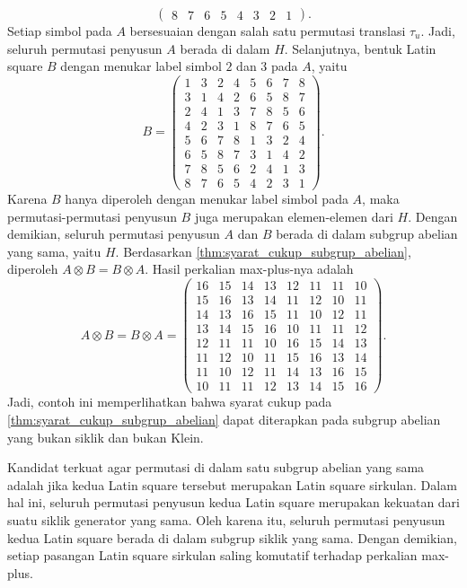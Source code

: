 \begin{contoh}
\[\begin{pmatrix}
      8 & 7 & 6 & 5 & 4 & 3 & 2 & 1
    \end{pmatrix}.
  \]
  Setiap simbol pada $A$ bersesuaian dengan salah satu permutasi translasi
  $\tau_u$. Jadi, seluruh permutasi penyusun $A$ berada di dalam $H$.
  Selanjutnya, bentuk Latin square $B$ dengan menukar label simbol $2$ dan
  $3$ pada $A$, yaitu
  \[
    B=
    \begin{pmatrix}
      1 & 3 & 2 & 4 & 5 & 6 & 7 & 8 \\
      3 & 1 & 4 & 2 & 6 & 5 & 8 & 7 \\
      2 & 4 & 1 & 3 & 7 & 8 & 5 & 6 \\
      4 & 2 & 3 & 1 & 8 & 7 & 6 & 5 \\
      5 & 6 & 7 & 8 & 1 & 3 & 2 & 4 \\
      6 & 5 & 8 & 7 & 3 & 1 & 4 & 2 \\
      7 & 8 & 5 & 6 & 2 & 4 & 1 & 3 \\
      8 & 7 & 6 & 5 & 4 & 2 & 3 & 1
    \end{pmatrix}.
  \]
  Karena $B$ hanya diperoleh dengan menukar label simbol pada $A$, maka
  permutasi-permutasi penyusun $B$ juga merupakan elemen-elemen dari $H$.
  Dengan demikian, seluruh permutasi penyusun $A$ dan $B$ berada di dalam
  subgrup abelian yang sama, yaitu $H$.
  Berdasarkan \autoref{thm:syarat_cukup_subgrup_abelian}, diperoleh
  $A\otimes B=B\otimes A$. Hasil perkalian max-plus-nya adalah
  \[
    A\otimes B
    =
    B\otimes A
    =
    \begin{pmatrix}
      16 & 15 & 14 & 13 & 12 & 11 & 11 & 10 \\
      15 & 16 & 13 & 14 & 11 & 12 & 10 & 11 \\
      14 & 13 & 16 & 15 & 11 & 10 & 12 & 11 \\
      13 & 14 & 15 & 16 & 10 & 11 & 11 & 12 \\
      12 & 11 & 11 & 10 & 16 & 15 & 14 & 13 \\
      11 & 12 & 10 & 11 & 15 & 16 & 13 & 14 \\
      11 & 10 & 12 & 11 & 14 & 13 & 16 & 15 \\
      10 & 11 & 11 & 12 & 13 & 14 & 15 & 16
    \end{pmatrix}.
  \]
  Jadi, contoh ini memperlihatkan bahwa syarat cukup pada
  \autoref{thm:syarat_cukup_subgrup_abelian} dapat diterapkan pada subgrup
  abelian yang bukan siklik dan bukan Klein.
\end{contoh}

Kandidat terkuat agar permutasi di dalam satu subgrup abelian yang sama adalah jika kedua Latin square tersebut merupakan Latin square sirkulan. Dalam hal ini, seluruh permutasi penyusun kedua Latin square merupakan kekuatan dari suatu siklik generator yang sama. Oleh karena itu, seluruh permutasi penyusun kedua Latin square berada di dalam subgrup siklik yang sama. Dengan demikian, setiap pasangan Latin square sirkulan saling komutatif terhadap perkalian max-plus.

